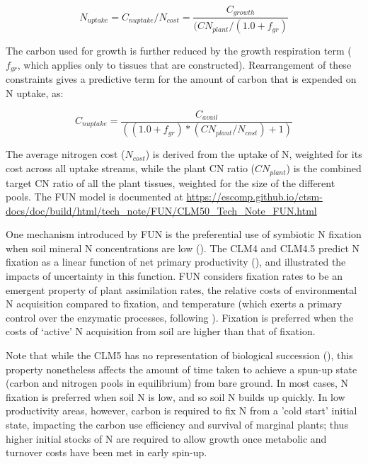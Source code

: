 \documentclass[draft,linenumbers]{agujournal}
\begin{document}
\begin{equation}
N_{uptake}=C_{nuptake}/N_{cost} =\frac{C_{growth}}{(CN_{plant}/(1.0+f_{gr})}
\end{equation}

The carbon used for growth is further reduced by the growth respiration term ($f_{gr}$, which applies only to tissues that are constructed). Rearrangement of these constraints gives a predictive term for the amount of carbon that is expended on N uptake, as:

\begin{equation}
C_{nuptake} =\frac{C_{avail}}{ ( (1.0+f_{gr})*(CN_{plant} / N_{cost}) + 1) }
\end{equation}

The average nitrogen cost ($N_{cost}$) is derived from the uptake of N, weighted for its cost across all uptake streams, while the plant CN ratio ($CN_{plant}$) is the combined target CN ratio of all the plant tissues, weighted for the size of the different pools. The FUN model is documented at \url{https://escomp.github.io/ctsm-docs/doc/build/html/tech_note/FUN/CLM50_Tech_Note_FUN.html}

One mechanism introduced by FUN is the preferential use of symbiotic N fixation when soil mineral N concentrations are low (\cite{vitousek2002}). The CLM4 and CLM4.5 predict N fixation as a linear function of net primary productivity (\cite{cleveland1999}), and \cite{wieder2015} illustrated the impacts of uncertainty in this function.  FUN considers fixation rates to be an emergent property of plant assimilation rates, the relative costs of environmental N acquisition compared to fixation, and temperature (which exerts a primary control over the enzymatic processes, following \cite{houlton2008}). Fixation is preferred when the costs of `active' N acquisition from soil are higher than that of fixation. 

Note that while the CLM5 has no representation of biological succession (\cite{fisher2018}), this property nonetheless affects the amount of time taken to achieve a spun-up state (carbon and nitrogen pools in equilibrium) from bare ground. In most cases, N fixation is preferred when soil N is low, and so soil N builds up quickly. In low productivity areas, however, carbon is required to fix N from a 'cold start' initial state, impacting the carbon use efficiency and survival of marginal plants; thus higher initial stocks of N are required to allow growth once metabolic and turnover costs have been met in early spin-up.
\end{document}
